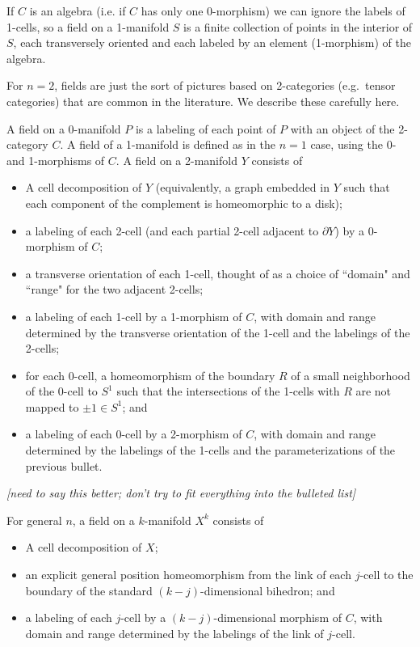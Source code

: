 \documentclass[11pt,leqno]{amsart}
\def\bd{\partial}
\def\nn#1{{{\it \small [#1]}}}
\begin{document}
If $C$ is an algebra (i.e. if $C$ has only one 0-morphism) we can ignore the labels
of 1-cells, so a field on a 1-manifold $S$ is a finite collection of points in the
interior of $S$, each transversely oriented and each labeled by an element (1-morphism)
of the algebra.

\medskip

For $n=2$, fields are just the sort of pictures based on 2-categories (e.g.\ tensor categories)
that are common in the literature.
We describe these carefully here.

A field on a 0-manifold $P$ is a labeling of each point of $P$ with
an object of the 2-category $C$.
A field of a 1-manifold is defined as in the $n=1$ case, using the 0- and 1-morphisms of $C$.
A field on a 2-manifold $Y$ consists of
\begin{itemize}
    \item A cell decomposition of $Y$ (equivalently, a graph embedded in $Y$ such
that each component of the complement is homeomorphic to a disk);
    \item a labeling of each 2-cell (and each partial 2-cell adjacent to $\bd Y$)
by a 0-morphism of $C$;
    \item a transverse orientation of each 1-cell, thought of as a choice of
``domain" and ``range" for the two adjacent 2-cells;
    \item a labeling of each 1-cell by a 1-morphism of $C$, with
domain and range determined by the transverse orientation of the 1-cell
and the labelings of the 2-cells;
    \item for each 0-cell, a homeomorphism of the boundary $R$ of a small neighborhood
of the 0-cell to $S^1$ such that the intersections of the 1-cells with $R$ are not mapped
to $\pm 1 \in S^1$; and
    \item a labeling of each 0-cell by a 2-morphism of $C$, with domain and range
determined by the labelings of the 1-cells and the parameterizations of the previous
bullet.
\end{itemize}
\nn{need to say this better; don't try to fit everything into the bulleted list}

For general $n$, a field on a $k$-manifold $X^k$ consists of
\begin{itemize}
    \item A cell decomposition of $X$;
    \item an explicit general position homeomorphism from the link of each $j$-cell
to the boundary of the standard $(k-j)$-dimensional bihedron; and
    \item a labeling of each $j$-cell by a $(k-j)$-dimensional morphism of $C$, with
domain and range determined by the labelings of the link of $j$-cell.
\end{itemize}
\end{document}
